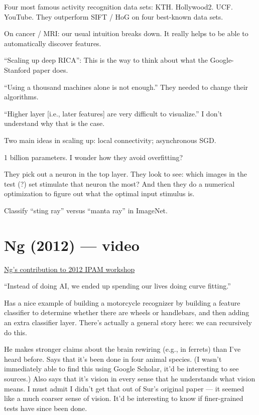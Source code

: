 \documentclass[12pt]{report}
\newcommand{\link}[2]{\href{#1}{#2}}
\begin{document}
Four most famous activity recognition data sets: KTH.
Hollywood2. UCF. YouTube.  They outperform SIFT / HoG on four
best-known data sets.

On cancer / MRI: our usual intuition breaks down.  It really helps to
be able to automatically discover features.

``Scaling up deep RICA'': This is the way to think about what the
Google-Stanford paper does.

``Using a thousand machines alone is not enough.''  They needed to
change their algorithms.  

``Higher layer [i.e., later features] are very difficult to
visualize.''  I don't understand why that is the case.

Two main ideas in scaling up: local connectivity; asynchronous SGD.  

1 billion parameters.  I wonder how they avoid overfitting?

They pick out a neuron in the top layer.  They look to see: which
images in the test (?) set stimulate that neuron the most?  And then
they do a numerical optimization to figure out what the optimal input
stimulus is.

Classify ``sting ray'' versus ``manta ray'' in ImageNet.

\section{Ng (2012) --- video}

\link{https://www.ipam.ucla.edu/schedule.aspx?pc=gss2012}{Ng's
  contribution to 2012 IPAM workshop}

``Instead of doing AI, we ended up spending our lives doing curve
fitting.''

Has a nice example of building a motorcycle recognizer by building a
feature classifier to determine whether there are wheels or
handlebars, and then adding an extra classifier layer.  There's
actually a general story here: we can recursively do this.

He makes stronger claims about the brain rewiring (e.g., in ferrets)
than I've heard before.  Says that it's been done in four animal
species.  (I wasn't immediately able to find this using Google
Scholar, it'd be interesting to see sources.)  Also says that it's
vision in every sense that he understands what vision means.  I must
admit I didn't get that out of Sur's original paper --- it seemed like
a much coarser sense of vision.  It'd be interesting to know if
finer-grained tests have since been done.
\end{document}
